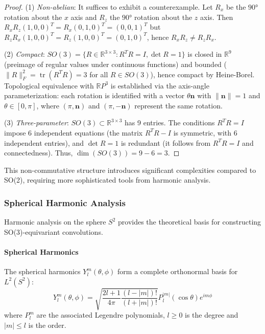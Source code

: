 \begin{proof}
(1) \textit{Non-abelian}: It suffices to exhibit a counterexample. Let $R_x$ be the $90°$ rotation about the $x$ axis and $R_z$ the $90°$ rotation about the $z$ axis. Then $R_x R_z (1,0,0)^T = R_x(0,1,0)^T = (0,0,1)^T$ but $R_z R_x (1,0,0)^T = R_z(1,0,0)^T = (0,1,0)^T$, hence $R_x R_z \neq R_z R_x$.

(2) \textit{Compact}: $SO(3) = \{R \in \mathbb{R}^{3\times 3} : R^TR = I, \det R = 1\}$ is closed in $\mathbb{R}^{9}$ (preimage of regular values under continuous functions) and bounded ($\|R\|_F^2 = \operatorname{tr}(R^TR) = 3$ for all $R \in SO(3)$), hence compact by Heine-Borel. Topological equivalence with $\mathbb{R}P^3$ is established via the axis-angle parameterization: each rotation is identified with a vector $\theta \mathbf{n}$ with $\|\mathbf{n}\| = 1$ and $\theta \in [0, \pi]$, where $(\pi, \mathbf{n})$ and $(\pi, -\mathbf{n})$ represent the same rotation.

(3) \textit{Three-parameter}: $SO(3) \subset \mathbb{R}^{3 \times 3}$ has 9 entries. The conditions $R^TR = I$ impose 6 independent equations (the matrix $R^TR - I$ is symmetric, with 6 independent entries), and $\det R = 1$ is redundant (it follows from $R^TR = I$ and connectedness). Thus, $\dim(SO(3)) = 9 - 6 = 3$.
\end{proof}

This non-commutative structure introduces significant complexities compared to SO(2), requiring more sophisticated tools from harmonic analysis.

\subsubsection{Spherical Harmonic Analysis}

Harmonic analysis on the sphere $S^2$ provides the theoretical basis for constructing SO(3)-equivariant convolutions.

\paragraph{Spherical Harmonics}

\begin{definition}
The spherical harmonics $Y_l^m(\theta, \phi)$ form a complete orthonormal basis for $L^2(S^2)$:
\begin{equation}
Y_l^m(\theta, \phi) = \sqrt{\frac{2l+1}{4\pi}\frac{(l-|m|)!}{(l+|m|)!}} P_l^{|m|}(\cos \theta) e^{im\phi}
\end{equation}
where $P_l^m$ are the associated Legendre polynomials, $l \geq 0$ is the degree and $|m| \leq l$ is the order.
\end{definition}


